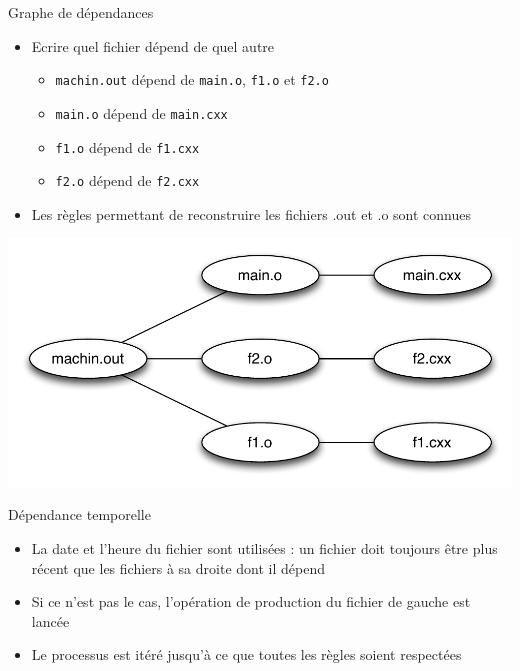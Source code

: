 \begin{frame}{Graphe de dépendances}
  \begin{itemize}
  \item Ecrire quel fichier dépend de quel autre
  \begin{itemize}
  \item \texttt{machin.out} dépend de \texttt{main.o}, \texttt{f1.o} et \texttt{f2.o}
  \item \texttt{main.o} dépend de \texttt{main.cxx}
  \item \texttt{f1.o} dépend de \texttt{f1.cxx}
  \item \texttt{f2.o} dépend de \texttt{f2.cxx}
  \end{itemize}
  \item Les règles permettant de reconstruire les fichiers .out et .o sont connues
  \end{itemize}
      \begin{center}
      \includegraphics[scale=.43]{fig/base-dependance.pdf}
    \end{center}

\end{frame}

\begin{frame}{Dépendance temporelle}
  \begin{itemize}
  \item La date et l'heure du fichier sont utilisées : un fichier doit toujours être plus récent que les fichiers à sa droite dont il dépend
  \item Si ce n'est pas le cas, l'opération de production du fichier de gauche est lancée
  \item Le processus est itéré jusqu'à ce que toutes les règles soient respectées
  \end{itemize}
\end{frame}

